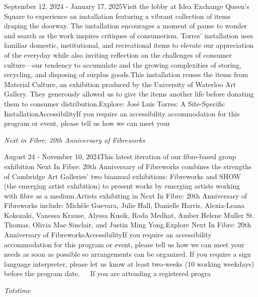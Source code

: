 \documentclass[letterpaper, 10pt]{article}
\newcommand{\subtitle}[1]{\textit{\large #1}\vspace{0.5em}}
\newcommand{\articlecontent}[1]{\small #1\vspace{1em}}
\begin{document}
\begin{multicols}{2}
{September 12, 2024 - January 17, 2025Visit the lobby at Idea Exchange Queen's Square to experience an installation featuring a vibrant collection of items draping the doorway. The installation encourages a moment of pause to wonder and search as the work inspires critiques of consumerism. Torres’ installation uses familiar domestic, institutional, and recreational items to elevate our appreciation of the everyday while also inviting reflection on the challenges of consumer culture—our tendency to accumulate and the growing complexities of storing, recycling, and disposing of surplus goods.This installation reuses the items from Material Culture, an exhibition produced by the University of Waterloo Art Gallery. They generously allowed us to give the items another life before donating them to consumer distribution.Explore: José Luis Torres: A Site-Specific InstallationAccessibilityIf you require an accessibility accommodation for this program or event, please tell us how we can meet your
}
\vspace{10px}

\subtitle{Next in Fibre: 20th Anniversary of Fibreworks}

\articlecontent{

\qrcode[height=1.5cm]{https://ideaexchange.libnet.info/event/11807099}
\vspace{10px}

August 24 - November 10, 2024This latest iteration of our fibre-based group exhibition Next In Fibre: 20th Anniversary of Fibreworks combines the strengths of Cambridge Art Galleries’ two biannual exhibitions: Fibreworks and SHOW (the emerging artist exhibition) to present works by emerging artists working with fibre as a medium.Artists exhibiting in Next In Fibre: 20th Anniversary of Fibreworks include: Michèle Guevara, Julie Hall, Danielle Harris, Alexia-Leana Kokozaki, Vanessa Krause, Alyssa Kusik, Roda Medhat, Amber Helene Muller St. Thomas, Olivia Mae Sinclair, and Justin Ming Yong.Explore Next In Fibre: 20th Anniversary of FibreworksAccessibilityIf you require an accessibility accommodation for this program or event, please tell us how we can meet your needs as soon as possible so arrangements can be organized. If you require a sign language interpreter, please let us know at least two-weeks (10 working weekdays) before the program date.   If you are attending a registered progra
}
\vspace{10px}

\subtitle{Totstime}

\articlecontent{

}
\end{multicols}
\end{document}
